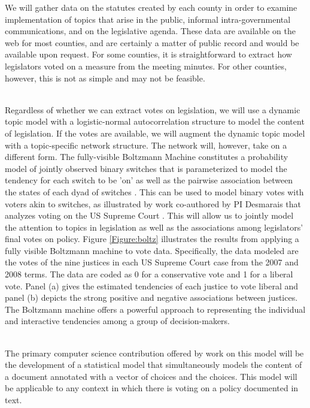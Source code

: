   We will gather data on the statutes created by each county in order to examine implementation of topics that arise in the public, informal intra-governmental communications, and on the legislative agenda. These data are available on the web for most counties, and are certainly a matter of public record and would be available upon request. For some counties, it is straightforward to extract how legislators voted on a measure from the meeting minutes. For other counties, however, this is not as simple and may not be feasible. 

~\\
 Regardless of whether we can extract votes on legislation, we will use a dynamic topic model with a logistic-normal autocorrelation structure  to model the content of legislation. If the votes are available, we will augment the dynamic topic model with a topic-specific network structure. The network will, however, take on a different form. The fully-visible Boltzmann Machine constitutes a probability model of jointly observed binary switches that is parameterized to model the tendency for each switch to be 'on' as well as the pairwise association between the states of each dyad of switches \cite{Gunawardana2008}. This can be used to model binary votes with voters akin to switches, as illustrated by work co-authored by PI Desmarais that analyzes voting on the US Supreme Court \cite{Desmarais2010}. This will allow us to jointly model the attention to topics in legislation as well as the associations among legislators' final votes on policy. Figure \ref{Figure:boltz} illustrates the results from applying a fully visible Boltzmann machine to vote data. Specifically, the data modeled are the votes of the nine justices in each US Supreme Court case from the 2007 and 2008 terms. The data are coded as 0 for a conservative vote and 1 for a liberal vote. Panel (a) gives the estimated tendencies of each justice to vote liberal and panel (b) depicts the strong positive and negative associations between justices. The Boltzmann machine offers a powerful approach to representing the individual and interactive tendencies among a group of decision-makers.

~\\
 The primary computer science contribution offered by work on this model will be the development of a statistical model that simultaneously models the content of a document annotated with a vector of choices and the choices. This model will be applicable to any context in which there is voting on a policy documented in text.

